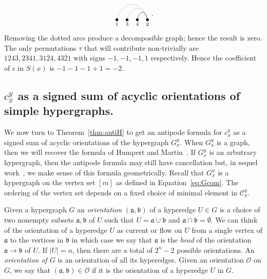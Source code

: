 \documentclass[ALCO,ThmDefs,Unicode,epreuves]{cedram}
\begin{document}
\begin{exam}
$$\begin{tikzpicture}[baseline=.2cm]
	\foreach \x in {1,2,3,4} 
		\node (\x) at (\x/2,0) [inner sep=-1pt] {$\bullet$};
	\node at (1/2,-.2) {$\scriptstyle 1$};
	\node at (2/2,-.2) {$\scriptstyle 3$};
	\node at (3/2,-.2) {$\scriptstyle 4$};
	\node at (4/2,-.2) {$\scriptstyle 2$};
	\draw [densely dotted](1) .. controls (1.5/2,1) and (3.5/2,1) .. (4); 
	\draw [densely dotted] (2) .. controls (2.5/2,.75) and (3.5/2,.75) .. (4); 
	\draw (3) .. controls (3.25/2,.5) and (3.75/2,.5) .. (4); 
\end{tikzpicture} .
$$
Removing the dotted arcs produce a decomposible graph; hence the result is zero. The only permutations
$\tau$ that will contribute non-trivially are $1243, 2341, 3124,4321$ with signs $-1,-1,-1,1$ respectively.
Hence the coefficient of $\epsilon$ in $S(x)$ is $-1-1-1+1=-2$.
\end{exam}

\subsection{\texorpdfstring{$c_x^y$}{cxy} as a signed sum of acyclic orientations of simple hypergraphs.}\label{subsec:acyclic} We now turn to Theorem~\ref{thm:antiH} to get an antipode formula for $c_x^y$ as a signed sum of acyclic orientations of the hypergraph $G_x^y$. When $G_x^y$ is a graph, then we will recover the formula of Humpert and Martin~\cite{Humpert-Martin}. If $G_x^y$ is an arbutrary hypergraph, then the antipode formula may still have cancellation but, in sequel work~\cite{BBM:2017}, we make sense of this formula geometrically. 
Recall that $G_x^y$ is a hypergraph on the vertex set $[m]$ as defined in Equation~\eqref{eq:Gcom}. The ordering of the vertex set depends on a fixed choice of minimal element in $\mathcal{C}_x^y$.

\begin{defi}[Orientation] Given a hypergraph $G$ an \emph{orientation} $(\mathfrak{a},\mathfrak{b})$ of a hyperedge $U\in G$ is a choice of two nonempty subsets $\mathfrak{a},\mathfrak{b}$ of $U$ such that $U=\mathfrak{a}\cup\mathfrak{b}$ and $\mathfrak{a}\cap\mathfrak{b}=\emptyset$. We can think of the orientation of a hyperedge $U$ as current or flow on $U$ from a single vertex of $\mathfrak{a}$ to the vertices in $\mathfrak{b}$ in which case we say that $\mathfrak{a}$ is the \emph{head} of the orientation $\mathfrak{a}\rightarrow\mathfrak{b}$ of $U$. 
 If $|U|=n$, then there are a total of $2^{n}-2$ possible orientations. An \emph{orientation of $G$} is an orientation of all its hyperedges. Given an orientation $\mathcal{O}$ on $G$, we say that $(\mathfrak{a},\mathfrak{b})\in\mathcal{O}$ if it is the orientation of a hyperedge $U$ in $G$.
\end{defi}
\end{document}
